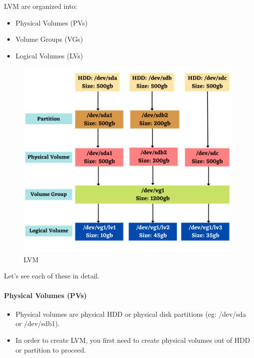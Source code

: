 \setlength{\columnsep}{3pt}
\begin{flushleft}
		LVM are organized into: 
		\begin{itemize}
			\item Physical Volumes (PVs)
			\item Volume Groups (VGs)
			\item Logical Volumes (LVs)
		\end{itemize}
		
		\begin{figure}[h!]
			\centering
			\includegraphics[scale=.6]{content/chapter9/images/lvm.png}
			\caption{LVM}
			\label{fig:lvm}
		\end{figure}
		
		\item Let's see each of these in detail.
	
	\newpage

	\paragraph{Physical Volumes (PVs)}
	\begin{itemize}
		\item Physical volumes are physical HDD or physical disk partitions (eg: /dev/sda or /dev/sdb1).
		\item In order to create LVM, you first need to create physical volumes out of HDD or partition to proceed.
	\end{itemize}


\end{flushleft}
